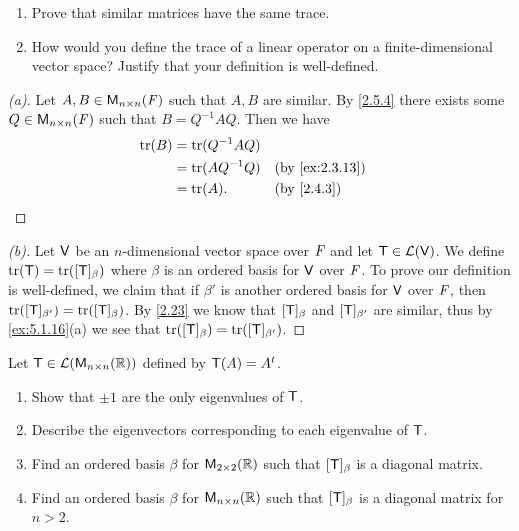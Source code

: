 \begin{ex}\label{ex:5.1.16}
  \begin{enumerate}
    \item Prove that similar matrices have the same trace.
    \item How would you define the trace of a linear operator on a finite-dimensional vector space?
          Justify that your definition is well-defined.
  \end{enumerate}
\end{ex}

\begin{proof}[(a)]
  Let \(A, B \in \mathsf{M}_{{n} \times n}({\mathit{F}})\) such that \(A, B\) are similar.
  By \cref{2.5.4} there exists some \(Q \in \mathsf{M}_{{n} \times n}({\mathit{F}})\) such that \(B = Q^{-1} A Q\).
  Then we have
  \begin{align*}
    \tr(B) & = \tr(Q^{-1} A Q)                                   \\
           & = \tr(A Q^{-1} Q) &  & \text{(by \cref{ex:2.3.13})} \\
           & = \tr(A).         &  & \text{(by \cref{2.4.3})}
  \end{align*}
\end{proof}

\begin{proof}[(b)]
  Let \(\mathsf{V}\) be an \(n\)-dimensional vector space over \(\mathit{F}\) and let \(\mathsf{T} \in \mathcal{L}(\mathsf{V})\).
  We define \(\tr(\T) = \tr([\T]_{\beta})\) where \(\beta\) is an ordered basis for \(\mathsf{V}\) over \(\mathit{F}\).
  To prove our definition is well-defined, we claim that if \(\beta'\) is another ordered basis for \(\mathsf{V}\) over \(\mathit{F}\), then \(\tr([\T]_{\beta'}) = \tr([\T]_{\beta})\).
  By \cref{2.23} we know that \([\mathsf{T}]_{\beta}\) and \([\mathsf{T}]_{\beta'}\) are similar, thus by \cref{ex:5.1.16}(a) we see that \(\tr([\T]_{\beta}) = \tr([\T]_{\beta'})\).
\end{proof}

\begin{ex}\label{ex:5.1.17}
  Let \(\mathsf{T} \in \mathcal{L}(\mathsf{M}_{{n} \times n}({\mathbb{R}}))\) defined by \(\mathsf{T}(A) = {A}^{t}\).
  \begin{enumerate}
    \item Show that \(\pm 1\) are the only eigenvalues of \(\mathsf{T}\).
    \item Describe the eigenvectors corresponding to each eigenvalue of \(\mathsf{T}\).
    \item Find an ordered basis \(\beta\) for \(\mathsf{M}_{{2} \times 2}({\mathbb{R}})\) such that \([\mathsf{T}]_{\beta}\) is a diagonal matrix.
    \item Find an ordered basis \(\beta\) for \(\mathsf{M}_{{n} \times n}({\mathbb{R}})\) such that \([\mathsf{T}]_{\beta}\) is a diagonal matrix for \(n > 2\).
  \end{enumerate}
\end{ex}

